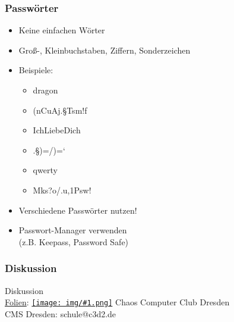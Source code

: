 \documentclass[12pt]{beamer}
\newcommand{\cc}[1]{\texttt{[image: img/\#1.png]}\hspace{1mm}}
\begin{document}
\begin{frame}
    \frametitle{Passwörter}
    \begin{itemize}
        \item<2-> Keine einfachen Wörter
        \item<3-> Groß-, Kleinbuchstaben, Ziffern, Sonderzeichen
        \item<4-> Beispiele:
            \begin{itemize}
                \item<5-> dragon
                \item<6-> (nCuAj.§Tsm!f
                \item<7-> IchLiebeDich
                \item<8-> .§)=/)=`
                \item<9-> qwerty
                \item<10-> Mks?o/.u,1Psw!
            \end{itemize}
        \item<12-> Verschiedene Passwörter nutzen!
        \item<13-> Passwort-Manager verwenden \\ (z.B. Keepass, Password Safe)
    \end{itemize}
\end{frame}

\begin{frame}
  \frametitle{Diskussion}
  \begin{center}
    {\Large Diskussion}\\
    \vspace{5mm} 
    \href{https://github.com/c3d2/cms-nsa}{Folien}: \href{https://creativecommons.org/licenses/by-sa/4.0/}{\cc{by-sa}} Chaos Computer Club Dresden \\
    \vspace{4mm}
    CMS Dresden: schule@c3d2.de
  \end{center}
\end{frame}
\end{document}
